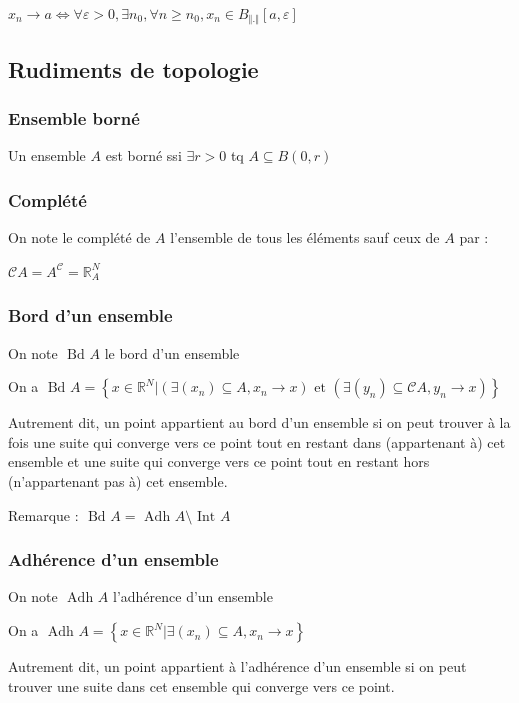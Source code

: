 \documentclass[a4paper,10pt]{article}
\newcommand{\Adh}{\mbox{ Adh }}
\newcommand{\Bd}{\mbox{ Bd }}
\newcommand{\Int}{\mbox{ Int }}
\newcommand{\ap}{\rightarrow}
\newcommand{\R}{\mathbb{R}}
\newcommand{\ioi}{\Leftrightarrow}
\newcommand{\tset}[1]{\left\lbrace #1 \right\rbrace}
\newcommand{\but}{\setminus}
\begin{document}
$x_n \ap a \ioi \forall \varepsilon > 0, \exists n_0, \forall n \geq n_0, x_n \in B_{\Vert . \Vert} \left[ a, \varepsilon \right]$

\subsection{Rudiments de topologie}

\subsubsection{Ensemble borné}

Un ensemble $A$ est borné ssi $\exists r > 0$ tq $A \subseteq B(0,r)$

\subsubsection{Complété}

On note le complété de $A$ l'ensemble de tous les éléments sauf ceux de $A$ par :

$\mathcal{C} A = A^\mathcal{C} = \R^N_A$

\subsubsection{Bord d'un ensemble}

On note $\Bd A$ le bord d'un ensemble

On a $\Bd A = \tset{x \in \R^N \vert (\exists (x_n) \subseteq A, x_n \ap x) \mbox{ et } (\exists (y_n) \subseteq \mathcal{C}A, y_n \ap x)}$

Autrement dit, un point appartient au bord d'un ensemble si on peut trouver à la fois une suite qui converge vers ce point tout en restant dans (appartenant à) cet ensemble et une suite qui converge vers ce point tout en restant hors (n'appartenant pas à) cet ensemble. 

Remarque : $\Bd A = \Adh A \but \Int A$

\subsubsection{Adhérence d'un ensemble}

On note $\Adh A$ l'adhérence d'un ensemble

On a $\Adh A = \tset{x \in \R^N \vert \exists (x_n) \subseteq A, x_n \ap x}$

Autrement dit, un point appartient à l'adhérence d'un ensemble si on peut trouver une suite dans cet ensemble qui converge vers ce point.
\end{document}

